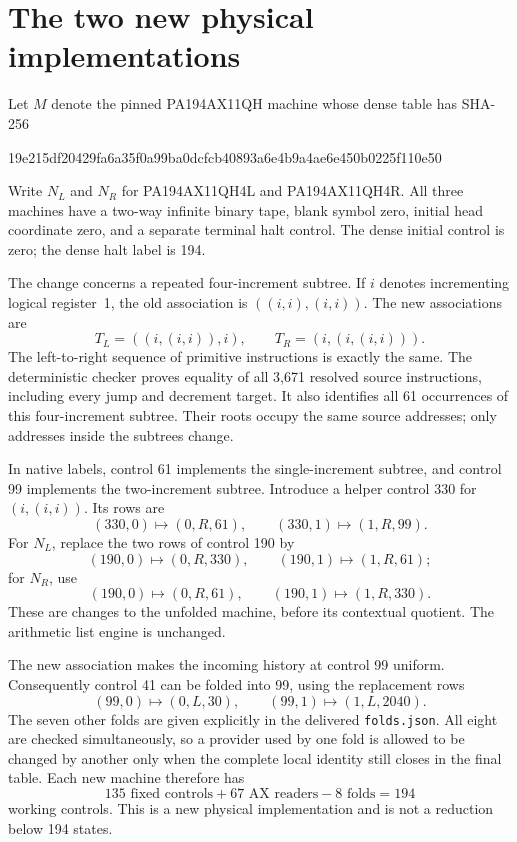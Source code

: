 \section{The two new physical implementations}

Let $M$ denote the pinned PA194AX11QH machine whose dense table has
SHA-256
\begin{center}\small\ttfamily
19e215df20429fa6a35f0a99ba0dcfcb40893a6e4b9a4ae6e450b0225f110e50
\end{center}
Write $N_L$ and $N_R$ for PA194AX11QH4L and PA194AX11QH4R.
All three machines have a two-way infinite binary tape, blank symbol zero,
initial head coordinate zero, and a separate terminal halt control.
The dense initial control is zero; the dense halt label is 194.

The change concerns a repeated four-increment subtree.  If
$i$ denotes incrementing logical register~1, the old association is
$((i,i),(i,i))$.  The new associations are
\[
 T_L=((i,(i,i)),i),\qquad T_R=(i,(i,(i,i))).
\]
The left-to-right sequence of primitive instructions is exactly the same.
The deterministic checker proves equality of all 3,671 resolved source
instructions, including every jump and decrement target.  It also identifies
all 61 occurrences of this four-increment subtree.  Their roots occupy the
same source addresses; only addresses inside the subtrees change.

In native labels, control 61 implements the single-increment subtree,
and control 99 implements the two-increment subtree.  Introduce a helper
control 330 for $(i,(i,i))$.  Its rows are
\[
 (330,0)\mapsto(0,R,61),\qquad
 (330,1)\mapsto(1,R,99).
\]
For $N_L$, replace the two rows of control 190 by
\[
 (190,0)\mapsto(0,R,330),\qquad
 (190,1)\mapsto(1,R,61);
\]
for $N_R$, use
\[
 (190,0)\mapsto(0,R,61),\qquad
 (190,1)\mapsto(1,R,330).
\]
These are changes to the unfolded machine, before its contextual quotient.
The arithmetic list engine is unchanged.

The new association makes the incoming history at control 99 uniform.
Consequently control 41 can be folded into 99, using the replacement rows
\[
 (99,0)\mapsto(0,L,30),\qquad
 (99,1)\mapsto(1,L,2040).
\]
The seven other folds are given explicitly in the delivered
\texttt{folds.json}.  All eight are checked simultaneously, so a provider
used by one fold is allowed to be changed by another only when the complete
local identity still closes in the final table.  Each new machine therefore
has
\[
 135\text{ fixed controls}+67\text{ AX readers}-8\text{ folds}=194
\]
working controls.  This is a new physical implementation and is not a
reduction below 194 states.


